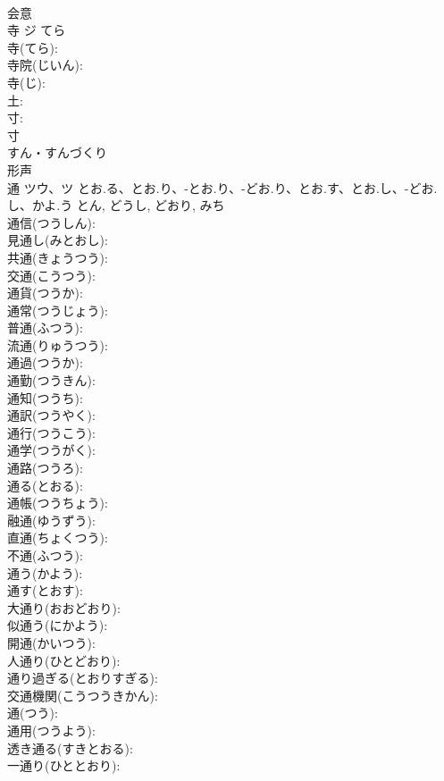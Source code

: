 \documentclass[8pt]{extreport}
\begin{document}
\begin{CJK}{UTF8}{min}
\\	会意 
\\	寺	ジ	てら		
\\	寺(てら): 
\\	寺院(じいん): 
\\	寺(じ): 
\\	土: 
\\	寸: 
\\	寸	
\\	すん・すんづくり	
\\	形声 
\\	通	ツウ、ツ	とお.る、とお.り、-とお.り、-どお.り、とお.す、とお.し、-どお.し、かよ.う	とん, どうし, どおり, みち	
\\	通信(つうしん): 
\\	見通し(みとおし): 
\\	共通(きょうつう): 
\\	交通(こうつう): 
\\	通貨(つうか): 
\\	通常(つうじょう): 
\\	普通(ふつう): 
\\	流通(りゅうつう): 
\\	通過(つうか): 
\\	通勤(つうきん): 
\\	通知(つうち): 
\\	通訳(つうやく): 
\\	通行(つうこう): 
\\	通学(つうがく): 
\\	通路(つうろ): 
\\	通る(とおる): 
\\	通帳(つうちょう): 
\\	融通(ゆうずう): 
\\	直通(ちょくつう): 
\\	不通(ふつう): 
\\	通う(かよう): 
\\	通す(とおす): 
\\	大通り(おおどおり): 
\\	似通う(にかよう): 
\\	開通(かいつう): 
\\	人通り(ひとどおり): 
\\	通り過ぎる(とおりすぎる): 
\\	交通機関(こうつうきかん): 
\\	通(つう): 
\\	通用(つうよう): 
\\	透き通る(すきとおる): 
\\	一通り(ひととおり): 

\end{CJK}
\end{document}
